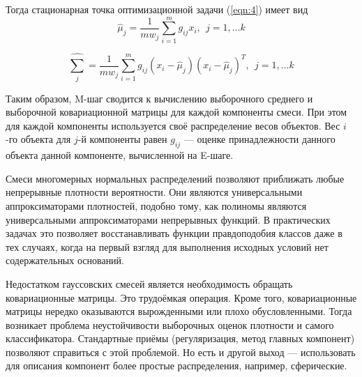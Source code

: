     Тогда стационарная точка оптимизационной задачи (\ref{eqn:4}) имеет вид
    $$\hat{\mu}_j = \frac{1}{mw_j} \sum_{i=1}^m g_{ij} x_i, \ \ j = 1, \dots k$$
    
    $$\hat{\sum_j} = \frac{1}{mw_j} \sum_{i=1}^m g_{ij} (x_i - \hat{\mu}_j)(x_i - \hat{\mu}_j)^T, \ \ j = 1, \dots k$$
    
    Таким образом, M-шаг сводится к вычислению выборочного среднего и выборочной ковариационной матрицы для каждой компоненты смеси. При этом для каждой компоненты используется своё распределение весов объектов. Вес $i$-го объекта для $j$-й компоненты равен $g_{ij}$ --- оценке принадлежности данного объекта данной компоненте, вычисленной на E-шаге.
    
    Смеси многомерных нормальных распределений позволяют приближать любые непрерывные плотности вероятности. Они являются универсальными аппроксиматорами плотностей, подобно тому, как полиномы являются универсальными аппроксиматорами непрерывных функций. В практических задачах это позволяет восстанавливать функции правдоподобия классов даже в тех случаях, когда на первый взгляд для выполнения исходных условий нет содержательных оснований.
    
    Недостатком гауссовских смесей является необходимость обращать ковариационные матрицы. Это трудоёмкая операция. Кроме того, ковариационные матрицы нередко оказываются вырожденными или плохо обусловленными. Тогда возникает проблема неустойчивости выборочных оценок плотности и самого классификатора. Стандартные приёмы (регуляризация, метод главных компонент) позволяют справиться с этой проблемой. Но есть и другой выход — использовать для описания компонент более простые распределения, например, сферические.
    
